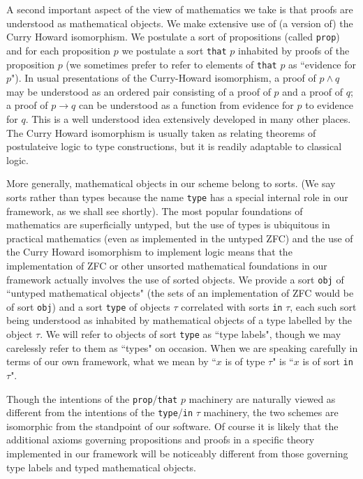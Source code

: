 \documentclass[12pt]{article}
\begin{document}
A second important aspect of the view of mathematics we take is that proofs are understood as mathematical objects.  We make extensive use of (a version of) the Curry Howard isomorphism.   We postulate a sort of propositions (called {\tt prop}) and for each proposition $p$ we postulate a sort {\tt that} $p$ inhabited by proofs of the proposition $p$ (we sometimes prefer to refer to elements of {\tt that} $p$ as ``evidence for $p$").  In usual presentations of the Curry-Howard isomorphism, a proof of $p \wedge q$ may be understood as an ordered pair consisting of a proof of $p$ and a proof of $q$;  a proof of $p \rightarrow q$ can be understood as a function from evidence for $p$ to evidence for $q$.  This is a well understood idea extensively developed in many other places.  The Curry Howard isomorphism is usually taken as relating theorems of postulateive logic to type constructions, but it is readily adaptable to classical logic.

More generally, mathematical objects in our scheme belong to sorts.  (We say sorts rather than types because the name {\tt type} has a special internal role in our framework, as we shall see shortly).   The most popular foundations of mathematics are superficially untyped, but the use of types is ubiquitous in practical mathematics (even as implemented in the untyped ZFC) and the use of the Curry Howard isomorphism to implement logic means that the implementation of ZFC or other unsorted mathematical foundations in our framework actually involves the use of sorted objects.  We provide a sort {\tt obj} of ``untyped mathematical objects" (the sets of an implementation of ZFC would be of sort {\tt obj}) and a sort {\tt type} of objects $\tau$ correlated with sorts {\tt in} $\tau$, each such sort being understood as inhabited by mathematical objects of a type labelled by the object $\tau$.  We will refer to objects of sort {\tt type} as ``type labels", though we may carelessly refer to them as ``types" on occasion.  When we are speaking carefully in terms of our own framework, what we mean by ``$x$ is of type $\tau$" is ``$x$ is of sort {\tt in} $\tau$". 

Though the intentions of the {\tt prop}/{\tt that} $p$ machinery are naturally viewed as different from the intentions of the {\tt type}/{\tt in} $\tau$ machinery, the two schemes are isomorphic from the standpoint of our software.  Of course it is likely that the additional axioms governing propositions and proofs in a specific theory implemented in our framework will be noticeably different from those governing type labels and typed mathematical objects.
\end{document}
